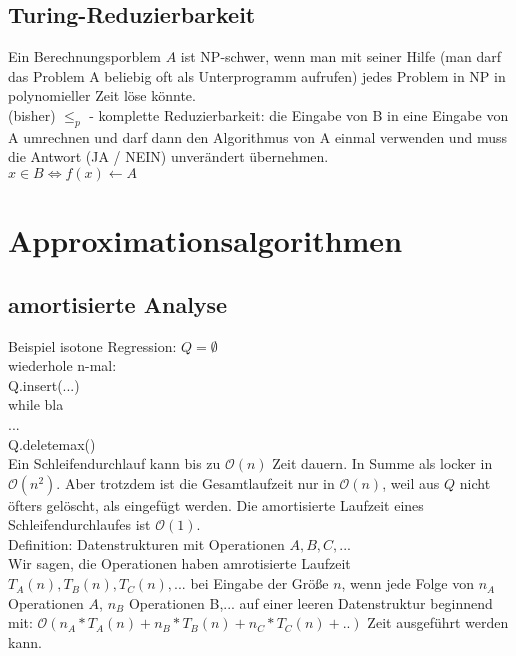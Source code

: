 \subsection{Turing-Reduzierbarkeit}
Ein Berechnungsporblem $A$ ist NP-schwer, wenn man mit seiner Hilfe (man darf das Problem A beliebig oft als Unterprogramm aufrufen) jedes Problem in NP in polynomieller Zeit löse könnte.\\
(bisher) $\leq_p$ - komplette Reduzierbarkeit: die Eingabe von B in eine Eingabe von A umrechnen und darf dann den Algorithmus von A einmal verwenden und muss die Antwort (JA / NEIN) unverändert übernehmen.\\
$x \in B \Leftrightarrow f(x) \leftarrow A$
\section{Approximationsalgorithmen}
\subsection{amortisierte Analyse}
Beispiel isotone Regression:
$Q = \emptyset$\\
wiederhole n-mal:\\
Q.insert(...)\\
while bla\\
...\\
Q.deletemax()\\
Ein Schleifendurchlauf kann bis zu $\mathcal{O}(n)$ Zeit dauern. In Summe als locker in $\mathcal{O}(n^2)$. Aber trotzdem ist die Gesamtlaufzeit nur in $\mathcal{O}(n)$, weil aus $Q$ nicht öfters gelöscht, als eingefügt werden. Die amortisierte Laufzeit eines Schleifendurchlaufes ist $\mathcal{O}(1)$.\\
Definition: Datenstrukturen mit Operationen $A,B,C,...$\\
Wir sagen, die Operationen haben amrotisierte Laufzeit $T_A(n),T_B(n),T_C(n),...$ bei Eingabe der Größe $n$, wenn jede Folge von $n_A$ Operationen $A$, $n_B$ Operationen B,... auf einer leeren Datenstruktur beginnend mit: $\mathcal{O}(n_A*T_A(n)+n_B*T_B(n)+n_C*T_C(n)+..)$ Zeit ausgeführt werden kann.\\
